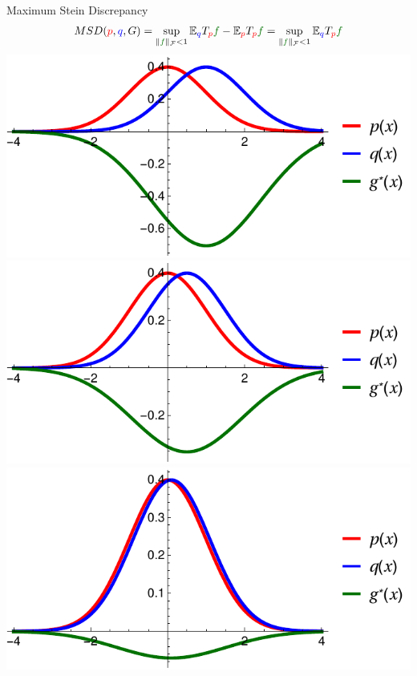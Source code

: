\begin{frame}
\begin{columns}
\begin{column}{.33\linewidth}
\begin{block}{Maximum Stein Discrepancy}
\large
\begin{align*}
MSD({\color{red} p},{ \color{blue} q},G) = \sup_{   \| {\color{mg} f} \|_\mathcal{F}<1} \ev_{{ \color{blue} q}} T_{\color{red} p} {\color{mg} f} - \ev_{{\color{red} p}} T_{\color{red} p} {\color{mg} f}  = \sup_{ \| {\color{mg} f} \|_\mathcal{F}<1} \ev_{{ \color{blue} q}} T_{\color{red} p} {\color{mg} f} 
\end{align*}
\vspace{2cm}
\centering
\includegraphics[scale=1.2]{../../presentation/img/s1.pdf}
\includegraphics[scale=1.2]{../../presentation/img/s05.pdf}\\
\includegraphics[scale=1.2]{../../presentation/img/s01.pdf}

\end{block}
\end{column}
\end{columns}
\end{frame}
